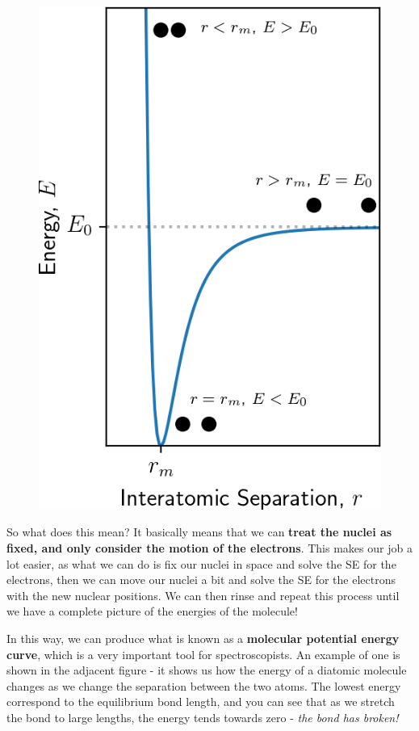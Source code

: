 \documentclass{memoir}[11pt,oneside,a4paper,openany]
\begin{document}
\begin{figure}
	\centering
	\includegraphics[width=\linewidth]{PES}
\end{figure}
So what does this mean? It basically means that we can \textbf{treat the nuclei as fixed, and only consider the motion of the electrons}. This makes our job a lot easier, as what we can do is fix our nuclei in space and solve the SE for the electrons, then we can move our nuclei a bit and solve the SE for the electrons with the new nuclear positions. We can then rinse and repeat this process until we have a complete picture of the energies of the molecule!  

In this way, we can produce what is known as a \textbf{molecular potential energy curve}, which is a very important tool for spectroscopists. An example of one is shown in the adjacent figure - it shows us how the energy of a diatomic molecule changes as we change the separation between the two atoms. The lowest energy correspond to the equilibrium bond length, and you can see that as we stretch the bond to large lengths, the energy tends towards zero - \emph{the bond has broken!}
\end{document}
